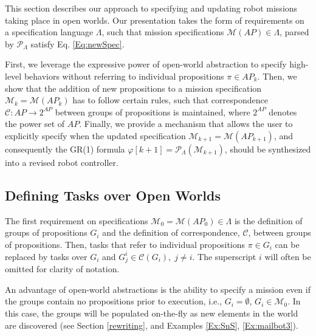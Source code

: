This section describes our approach to specifying and updating robot missions taking place in open worlds. 
Our presentation takes the form of requirements on a specification language $\Lambda$, such that mission specifications $\mathcal{M}(AP) \in \Lambda$, parsed by $\mathcal{P}_{\Lambda}$ satisfy Eq. \eqref{Eq:newSpec}. 

First, we leverage the expressive power of open-world abstraction to specify high-level behaviors without referring to individual propositions $\pi \in AP_k$. 
Then, we show that the addition of new propositions to a mission specification $\mathcal{M}_k = \mathcal{M}(AP_k)$ has to follow certain rules, such that correspondence $\mathcal{C}: AP \rightarrow 2^{AP}$ between groups of propositions is maintained, where $2^{AP}$ denotes the power set of $AP$.
Finally, we provide a mechanism that allows the user to explicitly specify when the updated specification $\mathcal{M}_{k+1} = \mathcal{M}(AP_{k+1})$, and consequently the GR(1) formula 
$\varphi [k+1] = \mathcal{P}_{\Lambda} (\mathcal{M}_{k+1})$,
should be synthesized into a revised robot controller.

\subsection{Defining Tasks over Open Worlds}

The first requirement on specifications $\mathcal{M}_0 = \mathcal{M}(AP_0) \in \Lambda$ is the definition of groups of propositions $G_i$ and the definition of correspondence, $\mathcal{C}$, between groups of propositions. Then, tasks that refer to individual propositions $\pi \in G_i$ can be replaced by tasks over $G_i$ and $G_j^i \in \mathcal{C}(G_i), \; j \not = i$. The superscript $i$ will often be omitted for clarity of notation.

An advantage of open-world abstractions is the ability to specify a mission even if the groups contain no propositions prior to execution, i.e., $G_i = \emptyset$, $G_i \in \mathcal{M}_0$. In this case, the groups will be populated on-the-fly as new elements in the world are discovered (see Section \ref{rewriting}, and Examples \ref{Ex:SnS}, \ref{Ex:mailbot3}).

